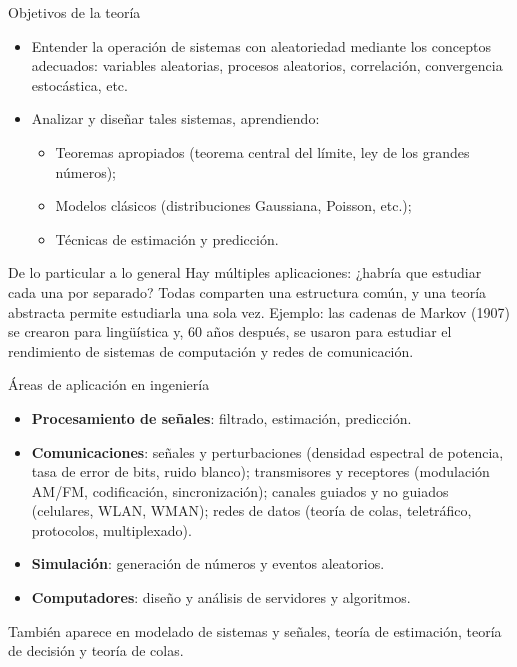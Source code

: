 \documentclass[aspectratio=169,11pt]{beamer}
\begin{document}
\begin{frame}{Objetivos de la teoría}
\begin{itemize}\small
\item Entender la operación de sistemas con aleatoriedad mediante los conceptos adecuados: variables aleatorias, procesos aleatorios, correlación, convergencia estocástica, etc.
\item Analizar y diseñar tales sistemas, aprendiendo:
\begin{itemize}
\item Teoremas apropiados (teorema central del límite, ley de los grandes números);
\item Modelos clásicos (distribuciones Gaussiana, Poisson, etc.);
\item Técnicas de estimación y predicción.
\end{itemize}
\end{itemize}

\vspace{0.2em}
\begin{exampleblock}{De lo particular a lo general}
\small
Hay múltiples aplicaciones: ¿habría que estudiar cada una por separado? Todas comparten una estructura común, y una teoría abstracta permite estudiarla una sola vez. Ejemplo: las cadenas de Markov (1907) se crearon para lingüística y, 60 años después, se usaron para estudiar el rendimiento de sistemas de computación y redes de comunicación.
\end{exampleblock}
\end{frame}

\begin{frame}{Áreas de aplicación en ingeniería}
\begin{itemize}\small
\item \textbf{Procesamiento de señales}: filtrado, estimación, predicción.
\item \textbf{Comunicaciones}: señales y perturbaciones (densidad espectral de potencia, tasa de error de bits, ruido blanco); transmisores y receptores (modulación AM/FM, codificación, sincronización); canales guiados y no guiados (celulares, WLAN, WMAN); redes de datos (teoría de colas, teletráfico, protocolos, multiplexado).
\item \textbf{Simulación}: generación de números y eventos aleatorios.
\item \textbf{Computadores}: diseño y análisis de servidores y algoritmos.
\end{itemize}

\vspace{0.3em}
También aparece en modelado de sistemas y señales, teoría de estimación, teoría de decisión y teoría de colas.
\end{frame}
\end{document}
